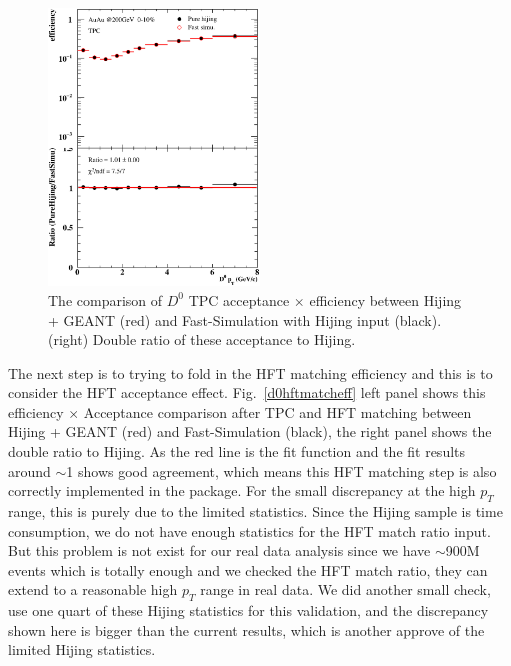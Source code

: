 \begin{figure}[htbp]
\centering
\includegraphics[keepaspectratio,width=0.5\textwidth]{figure/Run14_D0HFT/TpcOnly_0_10.eps}
\caption{The comparison of $D^0$ TPC acceptance $\times$ efficiency between Hijing + GEANT (red) and Fast-Simulation with Hijing input (black). (right) Double ratio of these acceptance to Hijing.}
\label{d0tpceff}
\end{figure}

The next step is to trying to fold in the HFT matching efficiency and this is to consider the HFT acceptance effect. Fig.~\ref{d0hftmatcheff} left panel shows this efficiency $\times$ Acceptance comparison after TPC and HFT matching between Hijing + GEANT (red) and Fast-Simulation (black), the right panel shows the double ratio to Hijing. As the red line is the fit function and the fit results around $\sim$1 shows good agreement, which means this HFT matching step is also correctly implemented in the package. For the small discrepancy at the high $p_T$ range, this is purely due to the limited statistics. Since the Hijing sample is time consumption, we do not have enough statistics for the HFT match ratio input. But this problem is not exist for our real data analysis since we have $\sim$900M events which is totally enough and we checked the HFT match ratio, they can extend to a reasonable high $p_T$ range in real data. We did another small check, use one quart of these Hijing statistics for this validation, and the discrepancy shown here is bigger than the current results, which is another approve of the limited Hijing statistics.

